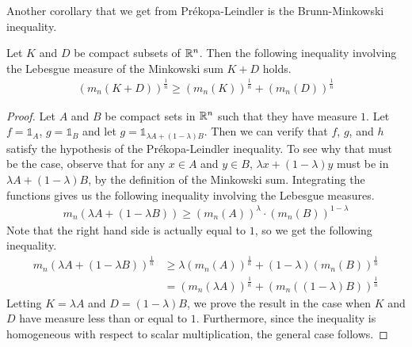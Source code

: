 \documentclass[11pt]{article}
\begin{document}
Another corollary that we get from Pr\'ekopa-Leindler is the Brunn-Minkowski inequality.
\begin{corollary}
  Let $K$ and $D$ be compact subsets of $\mathbb{R}^n$.
  Then the following inequality involving the Lebesgue measure of the Minkowski sum $K+D$ holds.
  \begin{align*}
    \left( m_n(K+D) \right)^{\frac{1}{n}} \geq \left( m_n(K) \right)^{\frac{1}{n}} + \left( m_n(D) \right)^{\frac{1}{n}}
  \end{align*}
\end{corollary}
\begin{proof}
  Let $A$ and $B$ be compact sets in $\mathbb{R}^n$ such that they have measure $1$.
  Let $f = \mathbb{1}_A$, $g = \mathbb{1}_B$ and let $g = \mathbb{1}_{\lambda A + (1-\lambda)B}$.
  Then we can verify that $f$, $g$, and $h$ satisfy the hypothesis of the Pr\'ekopa-Leindler inequality.
  To see why that must be the case, observe that for any $x \in A$ and $y \in B$, $\lambda x + (1-\lambda )y$ must be in $\lambda A + (1-\lambda)B$, by the definition of the Minkowski sum.
  Integrating the functions gives us the following inequality involving the Lebesgue measures.
  \begin{align*}
    m_n(\lambda A + (1-\lambda B)) \geq \left( m_n(A) \right)^{\lambda} \cdot \left( m_n(B) \right)^{1 - \lambda}
  \end{align*}
  Note that the right hand side is actually equal to $1$, so we get the following inequality.
  \begin{align*}
    m_n(\lambda A + (1-\lambda B))^{\frac{1}{n}} &\geq \lambda \left( m_n(A) \right)^{\frac{1}{n}} + (1-\lambda)(m_n(B))^{\frac{1}{n}} \\
    &= \left( m_n( \lambda A) \right)^{\frac{1}{n}} + (m_n( (1-\lambda)B))^{\frac{1}{n}}
  \end{align*}
  Letting $K = \lambda A$ and $D = (1-\lambda)B$, we prove the result in the case when $K$ and $D$ have measure less than or equal to $1$.
  Furthermore, since the inequality is homogeneous with respect to scalar multiplication, the general case follows.
\end{proof}
\end{document}
